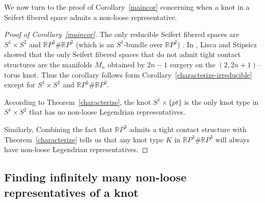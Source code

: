 \documentclass[11pt]{amsart}
\theoremstyle{plain}
\theoremstyle{definition}
\theoremstyle{remark}
\numberwithin{theorem}{section}
\newcommand{\R}{\mathbb{R}}           %
\begin{document}

We now turn to the proof of Corollary~\ref{maincor} concerning when a knot in a Seifert fibered space admits a non-loose representative. 
\begin{proof}[Proof of Corollary~\ref{maincor}]
The only reducible Seifert fibered spaces are $S^1\times S^2$ and $\R P^3\# \R P^3$ (which is an $S^1$-bundle over $\R P^2$) \cite[Proposition~1.12]{Hatcher}. In \cite{LiscaStipsicz09}, Lisca and Stipsicz showed that the only Seifert fibered spaces that do not admit tight contact structures are the manifolds $M_n$ obtained by $2n-1$ surgery on the $(2,2n+1)$--torus knot. Thus the corollary follows form Corollary~\ref{characterize-irreducible} except for $S^1 \times S^2$ and $\R P^3 \# \R P^3$.

According to Theorem~\ref{characterize}, the knot $S^1\times \{pt\}$ is the only knot type in $S^1\times S^2$ that has no non-loose Legendrian representatives. 

Similarly, Combining the fact that $\R P^3$ admits a tight contact structure with Theorem~\ref{characterize} tells us that any knot type $K$ in $\R P^3\# \R P^3$ will always have non-loose Legendrian representatives. 
\end{proof}



\subsection{Finding infinitely many non-loose representatives of a knot}
\end{document}
